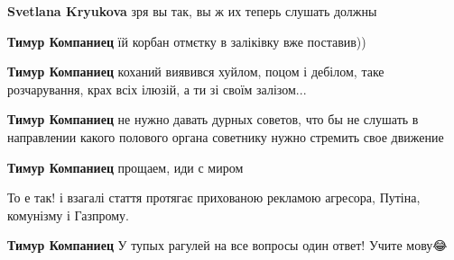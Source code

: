 \begin{itemize}
\begin{itemize}
\textbf{Svetlana Kryukova} зря вы так, вы ж их теперь слушать должны

 
\textbf{Тимур Компаниец} їй корбан отмєтку в заліківку вже поставив))

 
\textbf{Тимур Компаниец} коханий виявився хуйлом, поцом і дебілом, таке розчарування, крах всіх ілюзій, а ти зі своїм залізом...

 
\textbf{Тимур Компаниец} не нужно давать дурных советов, что бы не слушать в направлении какого полового органа советнику нужно стремить свое движение

 
\textbf{Тимур Компаниец} прощаем, иди с миром

 
То е так! і взагалі стаття протягає прихованою рекламою агресора, Путіна, комунізму і Газпрому.

 
\textbf{Тимур Компаниец} У тупых рагулей на все вопросы один ответ! Учите мову😂

 

\end{itemize}
\end{itemize}
